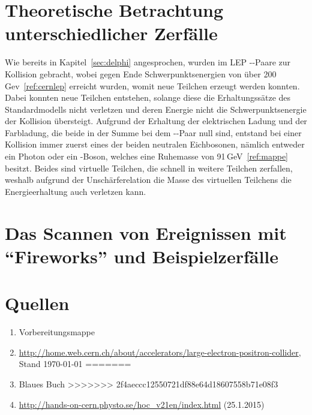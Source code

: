 \documentclass[a4paper,ngerman]{scrartcl}
\begin{document}
\section{Theoretische Betrachtung unterschiedlicher Zerfälle}
\label{sec:zerfaelle}

Wie bereits in Kapitel~\ref{sec:delphi} angesprochen, wurden im LEP \Pelectron-\APelectron-Paare zur Kollision gebracht, wobei gegen Ende Schwerpunktsenergien von über 200\,Gev~\ref{ref:cernlep} erreicht wurden,
womit neue Teilchen erzeugt werden konnten.
Dabei konnten neue Teilchen entstehen, 
solange diese die Erhaltungssätze des Standardmodells nicht verletzen 
und deren Energie nicht die Schwerpunktsenergie der Kollision übersteigt.
Aufgrund der Erhaltung der elektrischen Ladung und der Farbladung, 
die beide in der Summe bei dem \Pelectron-\APelectron-Paar null sind,
entstand bei einer Kollision immer zuerst eines der beiden neutralen Eichbosonen,
nämlich entweder ein Photon oder ein \PZzero-Boson,
welches eine Ruhemasse von 91\,GeV~\ref{ref:mappe} besitzt.
Beides sind virtuelle Teilchen, die schnell in weitere Teilchen zerfallen,
weshalb aufgrund der Unschärferelation die Masse des virtuellen Teilchens die Energieerhaltung auch verletzen kann.




\section{Das Scannen von Ereignissen mit "`Fireworks"' und Beispielzerfälle}
\label{sec:scannen}

\section{Quellen}
\begin{enumerate}
<<<<<<< HEAD
\item Vorbereitungsmappe \label{ref:mappe}
\item \url{http://home.web.cern.ch/about/accelerators/large-electron-positron-collider}, Stand \today \label{ref:cernlep}
=======
\item Blaues Buch \label{ref:BB}
>>>>>>> 2f4aeccc12550721df88e64d18607558b71e08f3
\item \url{http://hands-on-cern.physto.se/hoc_v21en/index.html} (25.1.2015)\label{ref:hands-on}
\end{enumerate}
\end{document}
